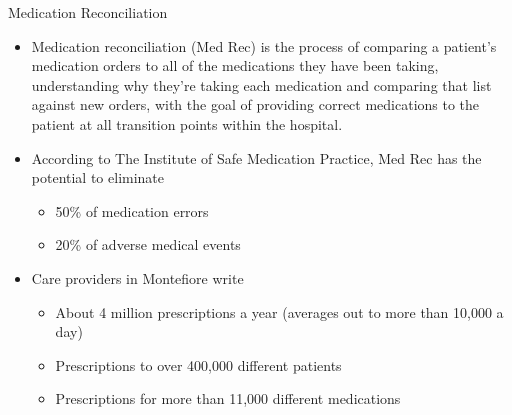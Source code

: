 \documentclass[10pt]{beamer}
\begin{document}
\begin{frame}{Medication Reconciliation}
	\begin{itemize}
		\item Medication reconciliation (Med Rec) is the process of comparing a patient's medication orders to all of the medications they have been taking, understanding why they're taking each medication and comparing that list against new orders, with the goal of providing correct medications to the patient at all transition points within the hospital.
		\item According to The Institute of Safe Medication Practice, Med Rec has the potential to eliminate
		\begin{itemize}
			\item 50\% of medication errors
			\item 20\% of adverse medical events
		\end{itemize}
		\item Care providers in Montefiore write 
		\begin{itemize}
			\item About 4 million prescriptions a year (averages out to more than 10,000 a day)
			\item Prescriptions to over 400,000 different patients
			\item Prescriptions for more than 11,000 different medications
		\end{itemize}		   
	\end{itemize}
\end{frame}
\end{document}
